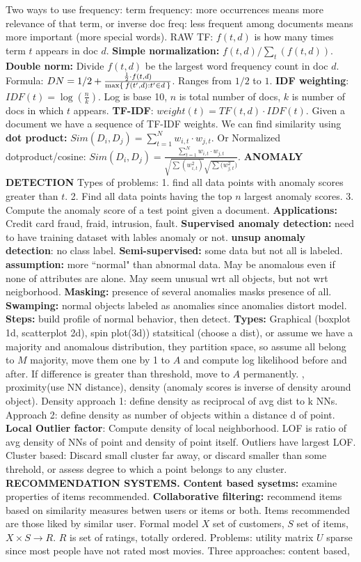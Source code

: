 \documentclass{amsbook}
\theoremstyle{plain}
\theoremstyle{definition}
\theoremstyle{remark}
\newcommand{\fracc}{\frac}
\newcommand{\lpar}{\left(}
\newcommand{\rpar}{\right)}
\begin{document}
Two ways to use frequency: term frequency: more occurrences means more relevance of that term, or inverse doc freq: less frequent among documents means more important (more special words). RAW TF: $f(t,d)$ is how many times term $t$ appears in doc $d$. \textbf{Simple normalization:} $f(t,d)/\sum_t(f(t,d))$. \textbf{Double norm: } Divide $f(t,d)$ be the largest word frequency count in doc $d$. Formula: $DN = 1/2 + \fracc{\fracc{1}{2}\cdot f(t,d)}{\max\Set{f(t',d):t' \in d}}$. Ranges from $1/2$ to $1$. \textbf{IDF weighting}: $IDF(t) = \log\lpar \fracc{n}{k} \rpar $. Log is base 10, $n$ is total number of docs, $k$ is number of docs in which $t$ appears. \textbf{TF-IDF}: $weight(t) = TF(t,d) \cdot IDF(t)$. Given a document we have a sequence of TF-IDF weights. We can find similarity using \textbf{dot product: }$Sim(D_i,D_j) = \sum_{t = 1}^N w_{i,t}\cdot w_{j,t}$. Or Normalized dotproduct/cosine: $Sim(D_i,D_j) = \fracc{\sum_{t = 1}^N w_{i,t}\cdot w_{j,t}}{\sqrt{\sum(w_{i,t}^2)}\sqrt{\sum(w_{j,t}^2})}$. \textbf{ANOMALY DETECTION} Types of problems: 1. find all data points with anomaly scores greater than $t$. 2. Find all data points having the top $n$ largest anomaly scores. 3. Compute the anomaly score of a test point given a document. \textbf{Applications: }Credit card fraud, fraid, intrusion, fault. \textbf{Supervised anomaly detection: } need to have training dataset with lables anomaly or not. \textbf{unsup anomaly detection}: no class label. \textbf{Semi-supervised: }some data but not all is labeled. \textbf{assumption: }more ``normal" than abnormal data. May be anomalous even if none of attributes are alone. May seem unusual wrt all objects, but not wrt neigborhood. \textbf{Masking: }presence of several anomalies masks presence of all. \textbf{Swamping: }normal objects labeled as anomalies since anomalies distort model. \textbf{Steps: }build profile of normal behavior, then detect. \textbf{Types: }Graphical (boxplot 1d, scatterplot 2d), spin plot(3d)) statsitical (choose a dist), or assume we have a majority and anomalous distribution, they partition space, so assume all belong to $M$ majority, move them one by 1 to $A$ and compute log likelihood before and after. If difference is greater than threshold, move to $A$ permanently. , proximity(use NN distance), density (anomaly scores is inverse of density around object). Density approach 1: define density as reciprocal of avg dist to k NNs. Approach 2: define density as number of objects within a distance d of point. \textbf{Local Outlier factor}: Compute density of local neighborhood. LOF is ratio of avg density of NNs of point and density of point itself. Outliers have largest LOF. Cluster based: Discard small cluster far away, or discard smaller than some threhold, or assess degree to which a point belongs to any cluster. \textbf{RECOMMENDATION SYSTEMS. } \textbf{Content based sysetms: } examine properties of items recommended. \textbf{Collaborative filtering: } recommend items based on similarity measures betwen users or items or both. Items recommended are those liked by similar user. Formal model $X$ set of customers, $S$ set of items, $X \times S \to R$. $R$ is set of ratings, totally ordered. Problems: utility matrix $U$ sparse since most people have not rated most movies. Three approaches: content based, 
\end{document}
